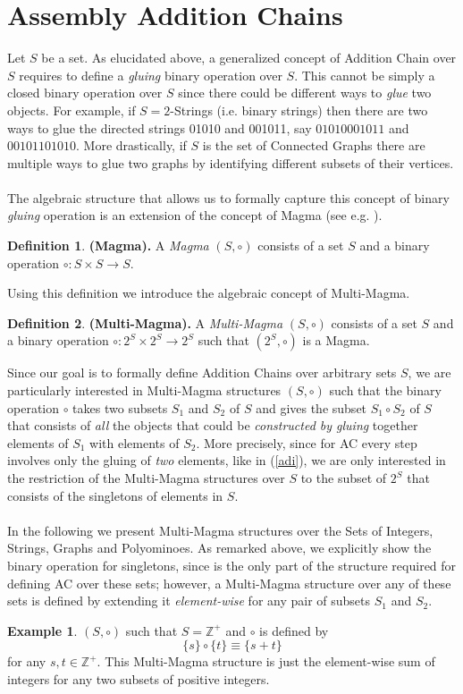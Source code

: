 \documentclass[letterpaper,12pt]{article}
\theoremstyle{definition}
\newtheorem{exmp}{Example}[section]
\newtheorem{definition}{Definition}
\begin{document}
\section{Assembly Addition Chains}\label{secAAC}
Let $S$ be a set. As elucidated above, a generalized concept of Addition Chain over $S$ requires to define a \textit{gluing} binary operation over $S$. This cannot be simply a closed binary operation over $S$ since there could be different ways to \textit{glue} two objects. For example, if $S=2$-Strings (i.e. binary strings) then there are two ways to glue the directed strings 01010 and 001011, say $01010001011$ and $00101101010$. More drastically, if $S$ is the set of Connected Graphs there are multiple ways to glue two graphs by identifying different subsets of their vertices.\\\\
The algebraic structure that allows us to formally capture this concept of binary \textit{gluing} operation is an extension of the concept of Magma (see e.g. \cite{bergman}).
\begin{definition} \textbf{(Magma).} A \textit{Magma} $(S,\circ)$ consists of a set $S$ and a binary operation $\circ: S \times S \to S$. 
\end{definition}
Using this definition we introduce the algebraic concept of Multi-Magma. 
\begin{definition} \textbf{(Multi-Magma).} A \textit{Multi-Magma} $(S,\circ)$ consists of a set $S$ and a binary operation $\circ :2^S \times 2^S \to 2^S$ such that $(2^S,\circ)$ is a Magma.   
\end{definition}
Since our goal is to formally define Addition Chains over arbitrary sets $S$, we are particularly interested in Multi-Magma structures $(S,\circ)$ such that the binary operation $\circ$ takes two subsets $S_1$ and $S_2$ of $S$ and gives the subset $S_1 \circ S_2$ of $S$ that consists of \textit{all} the objects that could be \textit{constructed by gluing} together elements of $S_1$ with elements of $S_2$. More precisely, since for AC every step involves only the gluing of \textit{two} elements, like in (\ref{adi}), we are only interested in the restriction of the Multi-Magma structures over $S$ to the subset of $2^S$ that consists of the singletons of elements in $S$. \\\\
In the following we present Multi-Magma structures over the Sets of Integers, Strings, Graphs and Polyominoes. As remarked above, we explicitly show the binary operation for singletons, since is the only part of the structure required for defining AC over these sets; however, a  Multi-Magma structure over any of these sets is defined by extending it \textit{element-wise} for any pair of subsets $S_1$ and $S_2$.
\begin{exmp}
    $(S,\circ)$ such that $S=\mathbb{Z}^+$ and $\circ$ is defined by 
    \begin{equation}
        \{s\} \circ \{t\} \equiv \{s+t\}
    \end{equation}
for any $s,t \in \mathbb{Z}^+$. This Multi-Magma structure is just the element-wise sum of integers for any two subsets of positive integers.  
\end{exmp}
\end{document}
